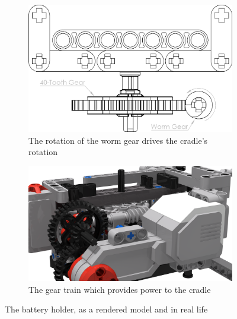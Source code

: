 \documentclass{report}
\begin{document}
	\begin{figure}[H]
		\centering
		\begin{subfigure}[b]{0.37999\textwidth}
			\includegraphics[width=\textwidth]{Resources/Images/dwgCradleWormGear.png}
			\caption{The rotation of the worm
				gear drives the cradle’s rotation}
			\label{fig:dwgCradleWormGear}
		\end{subfigure}
		\hspace{10mm}
		\begin{subfigure}[b]{0.42014\textwidth}
			\includegraphics[width=\textwidth]{Resources/Images/rdrCradleWormGear.png}
			\caption{The gear train which provides power to the cradle}
			\label{fig:rdrCradleWormGear}
		\end{subfigure}
		\caption{The battery holder, as a rendered model and in real life}
		\label{fig:cradleWormGear}
	\end{figure}
	
\end{document}
